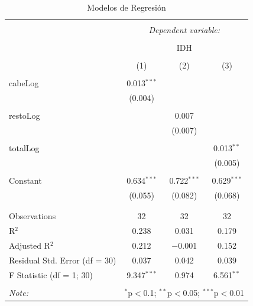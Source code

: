 \begin{table}[!htbp] \centering 
  \caption{Modelos de Regresión} 
  \label{regresiones} 
\begin{tabular}{@{\extracolsep{5pt}}lccc} 
\\[-1.8ex]\hline 
\hline \\[-1.8ex] 
 & \multicolumn{3}{c}{\textit{Dependent variable:}} \\ 
\cline{2-4} 
\\[-1.8ex] & \multicolumn{3}{c}{IDH} \\ 
\\[-1.8ex] & (1) & (2) & (3)\\ 
\hline \\[-1.8ex] 
 cabeLog & 0.013$^{***}$ &  &  \\ 
  & (0.004) &  &  \\ 
  & & & \\ 
 restoLog &  & 0.007 &  \\ 
  &  & (0.007) &  \\ 
  & & & \\ 
 totalLog &  &  & 0.013$^{**}$ \\ 
  &  &  & (0.005) \\ 
  & & & \\ 
 Constant & 0.634$^{***}$ & 0.722$^{***}$ & 0.629$^{***}$ \\ 
  & (0.055) & (0.082) & (0.068) \\ 
  & & & \\ 
\hline \\[-1.8ex] 
Observations & 32 & 32 & 32 \\ 
R$^{2}$ & 0.238 & 0.031 & 0.179 \\ 
Adjusted R$^{2}$ & 0.212 & $-$0.001 & 0.152 \\ 
Residual Std. Error (df = 30) & 0.037 & 0.042 & 0.039 \\ 
F Statistic (df = 1; 30) & 9.347$^{***}$ & 0.974 & 6.561$^{**}$ \\ 
\hline 
\hline \\[-1.8ex] 
\textit{Note:}  & \multicolumn{3}{r}{$^{*}$p$<$0.1; $^{**}$p$<$0.05; $^{***}$p$<$0.01} \\ 
\end{tabular} 
\end{table} 


















\endinput
